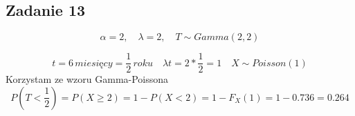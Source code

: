 \subsection{Zadanie 13}
$$\alpha = 2,\quad \lambda = 2,\quad T \sim Gamma(2, 2)$$

$$t = 6\, miesięcy = \frac{1}{2}\, roku\quad
\lambda t = 2 * \frac{1}{2} = 1 \quad X \sim Poisson(1)$$
Korzystam ze wzoru Gamma-Poissona
$$P(T < \frac{1}{2}) = P(X \geq 2) = 1 - P(X < 2) = 1 - F_X(1) = 1 - 0.736 = 0.264$$
